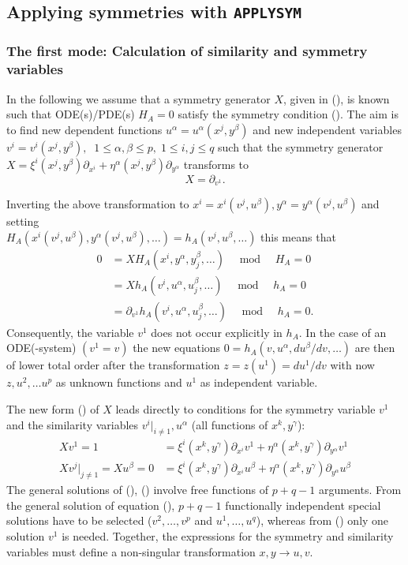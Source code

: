 \subsection{Applying symmetries with \texttt{APPLYSYM}}
\subsubsection{The first mode: Calculation of similarity and symmetry variables}
In the following we assume that a symmetry generator $X$, given
in (), is known such that ODE(s)/PDE(s) $H_A=0$
satisfy the symmetry condition (). The aim is to
find new dependent functions $u^\alpha = u^\alpha(x^j,y^\beta)$ and
new independent variables $v^i = v^i(x^j,y^\beta),\;\;
1\leq\alpha,\beta\leq p,\;1\leq i,j \leq q$
such that the symmetry generator
$X = \xi^i(x^j,y^\beta)\partial_{x^i} +
     \eta^\alpha(x^j,y^\beta)\partial_{y^\alpha}$
transforms to
\begin{equation}
X = \partial_{v^1}.    \label{sbed3}
\end{equation}

Inverting the above transformation to $x^i=x^i(v^j,u^\beta),
y^\alpha=y^\alpha(v^j,u^\beta)$ and setting \\
$H_A(x^i(v^j,u^\beta), y^\alpha(v^j,u^\beta),\ldots) =
h_A(v^j, u^\beta,\ldots)$
this means that
\begin{align*}
 0 &= X H_A(x^i,y^\alpha,y^\beta_j,\ldots)\;\;\; \bmod \;\;\; H_A=0 \\
   &= X h_A(v^i,u^\alpha,u^\beta_j,\ldots)\;\;\; \bmod \;\;\; h_A=0 \\
   &= \partial_{v^1}h_A(v^i,u^\alpha,u^\beta_j,\ldots)\;\;\; \bmod
         \;\;\; h_A=0.
\end{align*}
Consequently, the variable $v^1$ does not occur explicitly in $h_A$.
In the case of an ODE(-system) $(v^1=v)$
the new equations $0=h_A(v,u^\alpha,du^\beta/dv,\ldots)$
are then of lower total order
after the transformation $z = z(u^1) = du^1/dv$ with now $z, u^2,\ldots u^p$
as unknown functions and $u^1$ as independent variable.

The new form () of $X$ leads directly to conditions for the
symmetry variable $v^1$ and the similarity variables
$v^i|_{i\neq 1}, u^\alpha$ (all functions of $x^k,y^\gamma$):
\begin{align}
 X v^1 = 1 &= \xi^i(x^k,y^\gamma)\partial_{x^i}v^1 +
                \eta^\alpha(x^k,y^\gamma)\partial_{y^\alpha}v^1 \label{ql1} \\
 X v^j|_{j\neq 1} = X u^\beta = 0 &=
                 \xi^i(x^k,y^\gamma)\partial_{x^i}u^\beta +
                 \eta^\alpha(x^k,y^\gamma)\partial_{y^\alpha}u^\beta \label{ql2}
\end{align}
The general solutions of (), () involve free functions
of $p+q-1$ arguments. From the general solution of equation (),
$p+q-1$ functionally independent special solutions have to be selected
($v^2,\ldots,v^p$ and $u^1,\ldots,u^q$),
whereas from () only one solution $v^1$ is needed.
Together, the expressions for the symmetry and similarity variables must
define a non-singular transformation $x,y \rightarrow u,v$.


